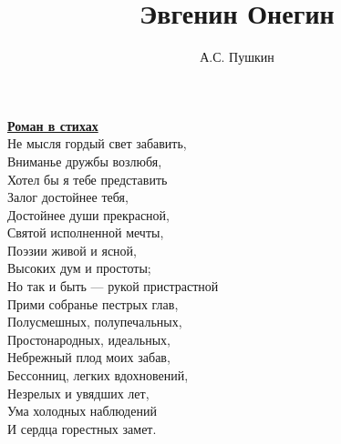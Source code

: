 \documentclass{book}
\title{Эвгенин Онегин}
\author{А.С. Пушкин}
\date{}
\begin{document}
\maketitle

\href{https://www.culture.ru/poems/4481/evgenii-onegin}
\textbf{Роман в стихах}\\
Не мысля гордый свет забавить,\\
Вниманье дружбы возлюбя,\\
Хотел бы я тебе представить\\
Залог достойнее тебя,\\
Достойнее души прекрасной,\\
Святой исполненной мечты,\\
Поэзии живой и ясной,\\
Высоких дум и простоты;\\
Но так и быть — рукой пристрастной\\
Прими собранье пестрых глав,\\
Полусмешных, полупечальных,\\
Простонародных, идеальных,\\
Небрежный плод моих забав,\\
Бессонниц, легких вдохновений,\\
Незрелых и увядших лет,\\
Ума холодных наблюдений\\
И сердца горестных замет.\\




\end{document}
